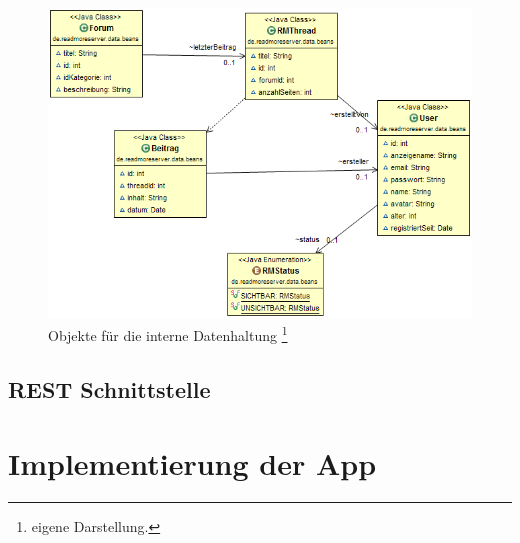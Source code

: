 \begin{figure}[!htbp]
\centering
\includegraphics[width=\textwidth]{Bilder/beans.png}
\caption[Objekte für die interne Datenhaltung]{Objekte für die interne Datenhaltung \protect\footnote{eigene Darstellung.} }
\label{dminfo}
\end{figure}
\subsection{REST Schnittstelle}

\section{Implementierung der App}